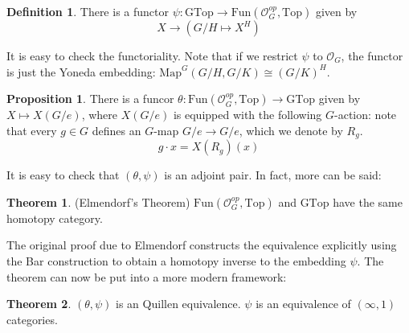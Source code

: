 \documentclass{article}
\theoremstyle{definition}
\newtheorem{theorem}{Theorem}[section]
\theoremstyle{definition}
\newtheorem{definition}{Definition}[theorem]
\theoremstyle{definition}
\theoremstyle{definition}
\newtheorem{proposition}{Proposition}[theorem]
\theoremstyle{definition}
\theoremstyle{definition}
\theoremstyle{definition}
\begin{document}
\begin{tcolorbox}[colback=purple!5!white,colframe=purple!75!black]
\begin{definition}
There is a functor $\psi: \textrm{GTop}\to \textrm{Fun}(\mathcal{O}^{op}_G,\textrm{Top})$ given by 
\[X\to (G/H\mapsto X^H)\]
\end{definition}
\end{tcolorbox}
It is easy to check the functoriality. Note that if we restrict $\psi$ to $\mathcal{O}_G$, the functor is just the Yoneda embedding: $\textrm{Map}^G(G/H,G/K)\cong (G/K)^H$.

\begin{tcolorbox}[colback=blue!5!white,colframe=blue!30!white]
    \begin{proposition}
    There is a funcor $\theta: \textrm{Fun}(\mathcal{O}^{op}_G,\textrm{Top})\to \textrm{GTop}$ given by $X\mapsto X(G/e)$, where $X(G/e)$ is equipped with the following $G$-action: note that every $g\in G$ defines an $G$-map $G/e\to G/e$, which we denote by $R_g$.
    \[g\cdot x=X(R_g)(x)\] 
    \end{proposition}
    \end{tcolorbox}
    
    It is easy to check that $(\theta,\psi)$ is an adjoint pair. In fact, more can be said:
    
    \begin{tcolorbox}[colback=red!5!white,colframe=red!30!white]
        \begin{theorem}
        (Elmendorf's Theorem) $\textrm{Fun}(\mathcal{O}^{op}_G,\textrm{Top})$ and $\textrm{GTop}$ have the same homotopy category. 
        \end{theorem}
        \end{tcolorbox}
    The original proof due to Elmendorf constructs the equivalence explicitly using the Bar construction to obtain a homotopy inverse to the embedding $\psi$. The theorem can now be put into a more modern framework:

    \begin{tcolorbox}[colback=red!5!white,colframe=red!30!white]
    \begin{theorem}
    $(\theta,\psi)$ is an Quillen equivalence. $\psi$ is an equivalence of $(\infty,1)$ categories. 
    \end{theorem}
    \end{tcolorbox}
\end{document}
